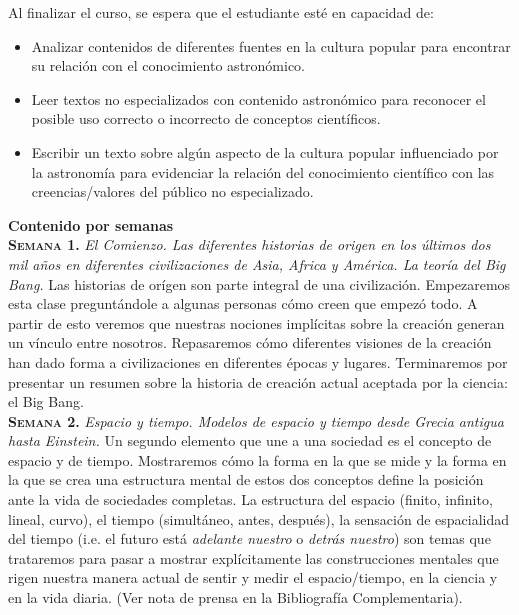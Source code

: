 \documentclass[letterpaper,10pt,onecolumn]{article}
\begin{document}
\noindent\normalsize Al finalizar el curso, se espera que el
estudiante est\'e en capacidad de: 

\begin{itemize}
\item Analizar contenidos de diferentes fuentes en la cultura popular
  para encontrar su relaci\'on con el conocimiento astron\'omico.\\[-0.6cm]
\item Leer textos no especializados con contenido astron\'omico para
  reconocer el posible uso correcto o incorrecto de conceptos cient\'ificos.
\\[-0.6cm]
\item Escribir un texto sobre alg\'un aspecto de la cultura popular
  influenciado por la astronom\'ia para evidenciar la relaci\'on del
  conocimiento cient\'ifico con las creencias/valores del p\'ublico no
  especializado.\\[-0.2cm]  
\end{itemize}

\noindent\textbf{\large {} \quad Contenido por
  semanas}\\[-0.2cm] 


\noindent\normalsize \textbf{\textsc{Semana 1.}} \textit{El Comienzo. Las
diferentes historias de origen en los \'ultimos dos mil a\~nos
en diferentes civilizaciones de Asia, Africa y Am\'erica. La teor\'ia
del Big Bang.} Las historias de or\'igen son parte integral de una
civilizaci\'on. Empezaremos esta clase pregunt\'andole a algunas
personas c\'omo creen que empez\'o todo. A partir de esto veremos que
nuestras nociones impl\'icitas sobre la creaci\'on generan un
v\'inculo entre nosotros. Repasaremos c\'omo diferentes visiones de la
creaci\'on han dado forma a civilizaciones en diferentes
\'epocas y lugares. Terminaremos por presentar un resumen sobre la
historia de creaci\'on actual aceptada por la ciencia: el Big Bang.\\[-0.3cm]   


\noindent\textbf{\textsc{Semana 2.}} \textit{Espacio y tiempo. Modelos de
espacio y tiempo desde Grecia antigua hasta Einstein.} Un segundo
elemento que une a una sociedad es el concepto de espacio y de
tiempo. Mostraremos c\'omo la forma en la que se mide y la forma en la que se crea una
estructura mental de estos dos conceptos define la
posici\'on ante la vida de sociedades completas. La estructura del
espacio (finito, infinito, lineal, curvo), el tiempo (simult\'aneo,
antes, despu\'es), la sensaci\'on de espacialidad del tiempo (i.e. el
futuro est\'a \emph{adelante nuestro} o \emph{detr\'as   nuestro}) son
temas que trataremos para pasar a mostrar expl\'icitamente las
construcciones mentales que rigen nuestra manera actual de sentir y
medir el espacio/tiempo, en la ciencia y en la vida diaria. (Ver nota
de prensa en la Bibliograf\'ia Complementaria).\\[-0.3cm]  
\end{document}
